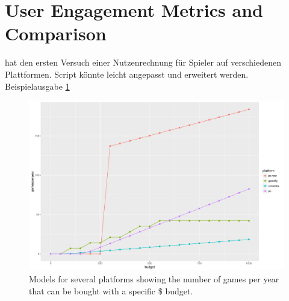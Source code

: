 \section{User Engagement Metrics and Comparison}
\label{sec:engagement}



 hat den ersten Versuch einer Nutzenrechnung für Spieler auf verschiedenen Plattformen. Script könnte leicht angepasst und erweitert werden. Beispielausgabe \ref{fig:gamesperyear-over-budget}


\begin{figure}[!t]
	\centering
	\includegraphics[width=1.0\columnwidth]{images/gamesperyear-over-budget.pdf}
	\caption{Models for several platforms showing the number of games per year that can be bought with a specific \$ budget.}
\label{fig:gamesperyear-over-budget}
\end{figure}

